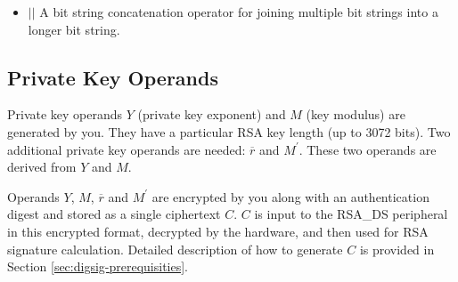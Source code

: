 \documentclass[main\_\_EN.tex]{subfiles}
\begin{document}
\begin{itemize}
    \item 
        \begin{math}{ || }\end{math}  \hspace{1.0cm}      A bit string concatenation operator for joining multiple bit strings into a longer bit string.
\end{itemize}

\subsection{Private Key Operands}
\label{sec:digsig-private-key-operands}

Private key operands \begin{math}Y\end{math} (private key exponent) and \begin{math}M\end{math} (key modulus) are generated by you. They have a particular RSA key length (up to 3072 bits).
Two additional private key operands are needed: \begin{math}\overline{r}\end{math} and \begin{math}M^{\prime}\end{math}. These two operands are derived from \begin{math}Y\end{math} and \begin{math}M\end{math}.

Operands \begin{math}Y\end{math}, \begin{math}M\end{math}, \begin{math}\overline{r}\end{math} and \begin{math}M^{\prime}\end{math} are encrypted by you along with an authentication digest and stored as a single ciphertext \begin{math}C\end{math}. \begin{math}C\end{math} is input to the RSA\_DS peripheral in this encrypted format, decrypted by the hardware, and then used for RSA signature calculation. Detailed description of how to generate \begin{math}C\end{math} is provided in Section \ref{sec:digsig-prerequisities}.
\end{document}
